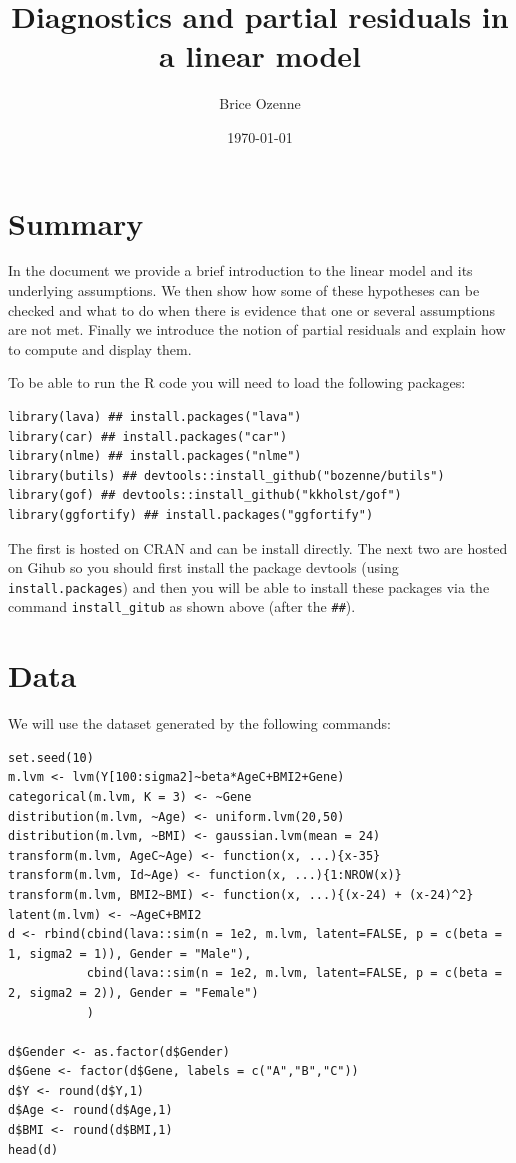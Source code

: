 \documentclass[12pt]{article}
\author{Brice Ozenne}
\date{\today}
\title{Diagnostics and partial residuals in a linear model}
\begin{document}
\maketitle

\section*{Summary}
\label{sec:org5edd4e1}
In the document we provide a brief introduction to the linear model
and its underlying assumptions. We then show how some of these
hypotheses can be checked and what to do when there is evidence that
one or several assumptions are not met. Finally we introduce the
notion of partial residuals and explain how to compute and display
them.

\bigskip

To be able to run the R code you will need to load the following
packages:
\lstset{language=r,label= ,caption= ,captionpos=b,numbers=none}
\begin{lstlisting}
library(lava) ## install.packages("lava")
library(car) ## install.packages("car")
library(nlme) ## install.packages("nlme")
library(butils) ## devtools::install_github("bozenne/butils")
library(gof) ## devtools::install_github("kkholst/gof")
library(ggfortify) ## install.packages("ggfortify")
\end{lstlisting}

The first is hosted on CRAN and can be install directly. The next two
are hosted on Gihub so you should first install the package devtools
(using \texttt{install.packages}) and then you will be able to install these
packages via the command \texttt{install\_gitub} as shown above (after the
\texttt{\#\#}).

\clearpage

\section{Data}
\label{sec:org5be7ed9}

We will use the dataset generated by the following commands:

\lstset{language=r,label= ,caption= ,captionpos=b,numbers=none}
\begin{lstlisting}
set.seed(10)
m.lvm <- lvm(Y[100:sigma2]~beta*AgeC+BMI2+Gene)
categorical(m.lvm, K = 3) <- ~Gene
distribution(m.lvm, ~Age) <- uniform.lvm(20,50)
distribution(m.lvm, ~BMI) <- gaussian.lvm(mean = 24)
transform(m.lvm, AgeC~Age) <- function(x, ...){x-35}
transform(m.lvm, Id~Age) <- function(x, ...){1:NROW(x)}
transform(m.lvm, BMI2~BMI) <- function(x, ...){(x-24) + (x-24)^2}
latent(m.lvm) <- ~AgeC+BMI2
d <- rbind(cbind(lava::sim(n = 1e2, m.lvm, latent=FALSE, p = c(beta = 1, sigma2 = 1)), Gender = "Male"),
		   cbind(lava::sim(n = 1e2, m.lvm, latent=FALSE, p = c(beta = 2, sigma2 = 2)), Gender = "Female")
		   )

d$Gender <- as.factor(d$Gender)
d$Gene <- factor(d$Gene, labels = c("A","B","C"))
d$Y <- round(d$Y,1)
d$Age <- round(d$Age,1)
d$BMI <- round(d$BMI,1)
head(d)
\end{lstlisting}
\end{document}
